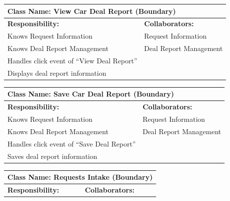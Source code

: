 \documentclass[]{article}
\begin{document}
\begin{itemize}
\begin{table}[H]
\begin{tabular}{|p{6cm}|p{6cm}|}
            \hline
            \end{tabular}
        \end{table}
        \begin{table}[H]
            \centering
            \begin{tabular}{|p{6cm}|p{6cm}|}
            \hline 
             \multicolumn{2}{|l|}{\textbf{Class Name: View Car Deal Report (Boundary)}} \\
            \hline
            \textbf{Responsibility:} & \textbf{Collaborators:} \\
            \hline
            Knows Request Information & Request Information \\
            Knows Deal Report Management & Deal Report Management \\
            Handles click event of “View Deal Report” & \\
            Displays deal report information & \\
            \hline
            \end{tabular}
        \end{table}   
        \begin{table}[H]
            \centering
            \begin{tabular}{|p{6cm}|p{6cm}|}
            \hline 
             \multicolumn{2}{|l|}{\textbf{Class Name: Save Car Deal Report (Boundary)}} \\
            \hline
            \textbf{Responsibility:} & \textbf{Collaborators:} \\
            \hline
            Knows Request Information & Request Information \\
            Knows Deal Report Management & Deal Report Management \\
            Handles click event of “Save Deal Report” & \\
            Saves deal report information & \\
            \hline
            \end{tabular}
        \end{table}
        \begin{table}[H]
            \centering
            \begin{tabular}{|p{6cm}|p{6cm}|}
                \hline 
                \multicolumn{2}{|l|}{\textbf{Class Name: Requests Intake (Boundary)}} \\
                \hline
                \textbf{Responsibility:} & \textbf{Collaborators:} \\

\end{tabular}
\end{table}
\end{itemize}
\end{document}
